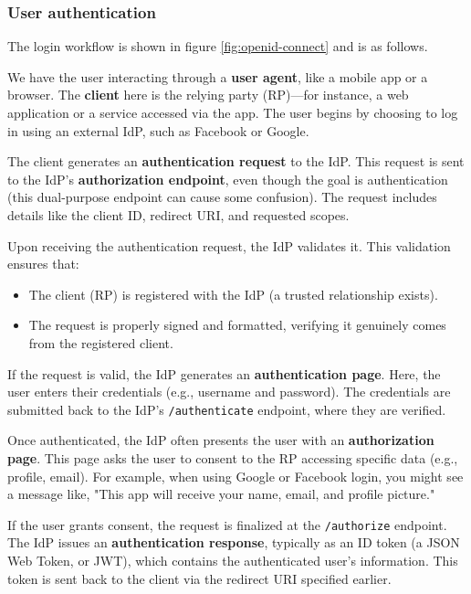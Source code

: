 \subsubsection{User authentication}
The login workflow is shown in figure \ref{fig:openid-connect} and is
as follows.

We have the user interacting through a \textbf{user agent}, like a
mobile app or a browser. The \textbf{client} here is the relying party
(RP)—for instance, a web application or a service accessed via the
app. The user begins by choosing to log in using an external IdP, such
as Facebook or Google.

The client generates an \textbf{authentication request} to the IdP.
This request is sent to the IdP’s \textbf{authorization endpoint}, even
though the goal is authentication (this dual-purpose endpoint can
cause some confusion). The request includes details like the client
ID, redirect URI, and requested scopes.

Upon receiving the authentication request, the IdP validates it. This
validation ensures that:

\begin{itemize}
  \item The client (RP) is registered with the IdP (a trusted
    relationship exists).
  \item The request is properly signed and formatted, verifying it
    genuinely comes from the registered client.
\end{itemize}

If the request is valid, the IdP generates an \textbf{authentication
page}. Here, the user enters their credentials (e.g., username and
password). The credentials are submitted back to the IdP’s
\texttt{/authenticate} endpoint, where they are verified.

Once authenticated, the IdP often presents the user with an
\textbf{authorization page}. This page asks the user to consent to the
RP accessing specific data (e.g., profile, email). For example, when
using Google or Facebook login, you might see a message like, "This
app will receive your name, email, and profile picture." 

If the user grants consent, the request is finalized at the
\texttt{/authorize} endpoint. The IdP issues an \textbf{authentication
response}, typically as an ID token (a JSON Web Token, or JWT), which
contains the authenticated user’s information. This token is sent back
to the client via the redirect URI specified earlier.

